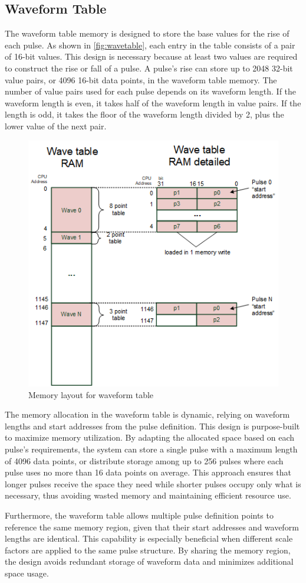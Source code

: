 \subsection{Waveform Table}
The waveform table memory is designed to store the base values for the rise of each pulse. As shown in \autoref{fig:wavetable}, each entry in the table consists of a pair of 16-bit values. This design is necessary because at least two values are required to construct the rise or fall of a pulse. A pulse's rise can store up to 2048 32-bit value pairs, or 4096 16-bit data points, in the waveform table memory. The number of value pairs used for each pulse depends on its waveform length. If the waveform length is even, it takes half of the waveform length in value pairs. If the length is odd, it takes the floor of the waveform length divided by 2, plus the lower value of the next pair.
\begin{figure}[htbp]
    \centering
    \includegraphics[width=0.5\linewidth]{figures/3.3.png}
    \caption{Memory layout for waveform table}
    \label{fig:wavetable}
\end{figure}
The memory allocation in the waveform table is dynamic, relying on waveform lengths and start addresses from the pulse definition. This design is purpose-built to maximize memory utilization. By adapting the allocated space based on each pulse's requirements, the system can store a single pulse with a maximum length of 4096 data points, or distribute storage among up to 256 pulses where each pulse uses no more than 16 data points on average. This approach ensures that longer pulses receive the space they need while shorter pulses occupy only what is necessary, thus avoiding wasted memory and maintaining efficient resource use.

Furthermore, the waveform table allows multiple pulse definition points to reference the same memory region, given that their start addresses and waveform lengths are identical. This capability is especially beneficial when different scale factors are applied to the same pulse structure. By sharing the memory region, the design avoids redundant storage of waveform data and minimizes additional space usage. 

